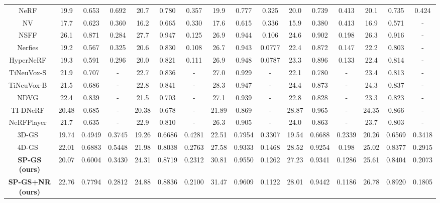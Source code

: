 \begin{table}[th]
{\begin{tabular}{c|*{3}{c}|*{3}{c}|*{3}{c}|*{3}{c}|*{3}{c}}
        NeRF~\cite{NeRF} & 19.9 & 0.653 & 0.692 & 20.7 & 0.780 & 0.357 & 19.9 & 0.777 & 0.325 & 20.0 & 0.739 & 0.413 & 20.1 & 0.735  & 0.424 \\
        NV~\cite{NV} & 17.7 &  0.623 & 0.360 & 16.2 & 0.665 & 0.330 & 17.6 & 0.615 & 0.336 & 15.9 & 0.380 & 0.413 & 16.9 & 0.571 & -  \\
        NSFF~\cite{NSFF}  & 26.1 & 0.871 & 0.284 & 27.7 & 0.947 & 0.125 & 26.9 & 0.944 & 0.106 & 24.6 & 0.902 & 0.198 & 26.3 & 0.916 & -  \\
        Nerfies~\cite{Nerfies}  & 19.2 & 0.567 & 0.325 & 20.6 & 0.830 & 0.108 & 26.7 & 0.943 & 0.0777 & 22.4 & 0.872 & 0.147  & 22.2 & 0.803 & - \\
        HyperNeRF~\cite{HyperNeRF}  & 19.3 & 0.591 & 0.296 & 20.0 & 0.821 & 0.111 & 26.9 & 0.948 & 0.0787 & 23.3 & 0.896 & 0.133 & 22.4 & 0.814  & - \\
        TiNeuVox-S~\cite{TiNeuVox}  & 21.9 & 0.707 & -& 22.7 & 0.836 & -& 27.0 & 0.929 & - & 22.1&0.780&-  & 23.4 & 0.813 &- \\
        TiNeuVox-B~\cite{TiNeuVox} & 21.5 & 0.686 &- & 22.8 & 0.841 & -&  28.3 & 0.947 & - & 24.4&0.873& - & 24.3 & 0.837 & - \\ 
        NDVG~\cite{NDVG} & 22.4 & 0.839 & - & 21.5 & 0.703 & - & 27.1  & 0.939 & - & 22.8 & 0.828 & - & 23.3 & 0.823 & - \\
        TI-DNeRF~\cite{TI-DNeRF} & 20.48 & 0.685 & - & 20.38 & 0.678 & - &21.89&0.869 & - & 28.87 & 0.965 &-   & 24.35 & 0.866 &- \\
        NeRFPlayer~\cite{NeRFPlayer}  & 21.7 & 0.635 & - &22.9&0.810& -  & 26.3 & 0.905 & - & 24.0 & 0.863 & - & 23.7 & 0.803 & -\\
        3D-GS~\cite{3D-GS} & 19.74 & 0.4949 & 0.3745 & 19.26 & 0.6686  & 0.4281  & 22.51 & 0.7954 & 0.3307 & 19.54 & 0.6688 & 0.2339 & 20.26 & 0.6569  & 0.3418 \\
        4D-GS~\cite{RealTime4DGS} & 22.01 & 0.6883 & 0.5448 & 21.98 & 0.8038 & 0.2763 & 27.58 & 0.9333 & 0.1468 & 28.52 & 0.9254 & 0.198 & 25.02 & 0.8377 & 0.2915  \\
        \textbf{SP-GS (ours)}    & 20.07 & 0.6004 & 0.3430 & 24.31 & 0.8719 & 0.2312 & 30.81 & 0.9550 & 0.1262 & 27.23 & 0.9341 & 0.1286 & 25.61 & 0.8404 & 0.2073 \\
        \textbf{SP-GS+NR (ours)} & 22.76 & 0.7794 & 0.2812 & 24.88 & 0.8836	& 0.2100 & 31.47 & 0.9609 & 0.1122 & 28.01 & 0.9442 & 0.1186 & 26.78 & 0.8920 & 0.1805 \\
        \bottomrule
    \end{tabular}
    }
\end{table}

